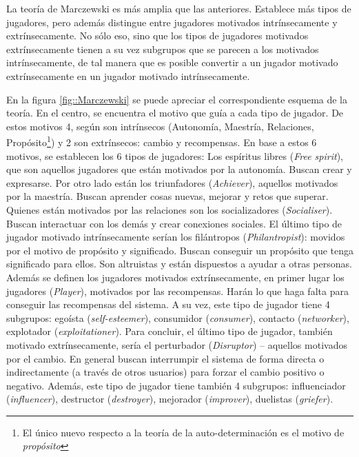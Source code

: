 La teoría de Marczewski  \cite{marczewski} es más amplia que las anteriores.
%
Establece más tipos de jugadores, pero además distingue entre jugadores motivados intrínsecamente y extrínsecamente.
%
No sólo eso, sino que los tipos de jugadores motivados extrínsecamente tienen a su vez subgrupos que se parecen a los motivados intrínsecamente, de tal manera que es posible convertir a un jugador motivado extrínsecamente en un jugador motivado intrínsecamente.

En la figura \ref{fig::Marczewski} se puede apreciar el correspondiente esquema de la teoría.
%
En el centro, se encuentra el motivo que guía a cada tipo de jugador. 
%
De estos motivos 4, según  \cite{marczewski} son intrínsecos (Autonomía, Maestría, Relaciones, Propósito\footnote{El único nuevo respecto a la teoría de la auto-determinación  \cite{SDT} es el motivo de \textit{propósito}}) y 2 son extrínsecos: cambio y recompensas.
%
En base a estos 6 motivos, se establecen los 6 tipos de jugadores:
%
Los espíritus libres (\textit{Free spirit}), que son aquellos jugadores que están motivados por la autonomía. Buscan crear y expresarse.
%
Por otro lado están los triunfadores (\textit{Achiever}), aquellos motivados por la maestría. 
%
Buscan aprender cosas nuevas, mejorar y retos que superar.
%
Quienes están motivados por las relaciones son los socializadores (\textit{Socialiser}).
%
Buscan interactuar con los demás y crear conexiones sociales.
%
El último tipo de jugador motivado intrínsecamente serían los filántropos (\textit{Philantropist}): movidos por el motivo de propósito y significado.
%
Buscan conseguir un propósito que tenga  significado para ellos.
%
Son altruistas y están dispuestos a ayudar a otras personas.
%
Además se definen los jugadores motivados extrínsecamente, en primer lugar los jugadores (\textit{Player}), motivados por las recompensas. 
%
Harán lo que haga falta para conseguir las recompensas del sistema.
%
A su vez, este tipo de jugador tiene 4 subgrupos: egoísta (\textit{self-esteemer}), consumidor (\textit{consumer}), contacto (\textit{networker}), explotador (\textit{exploitationer}).
%
Para concluir, el último tipo de jugador, también motivado extrínsecamente, sería el perturbador (\textit{Disruptor}) -- aquellos motivados por el cambio. 
%
En general buscan interrumpir el sistema de forma directa o indirectamente (a través de otros usuarios) para forzar el cambio positivo o negativo.
%
Además, este tipo de jugador tiene también 4 subgrupos: influenciador (\textit{influencer}), destructor (\textit{destroyer}), mejorador (\textit{improver}), duelistas (\textit{griefer}).

